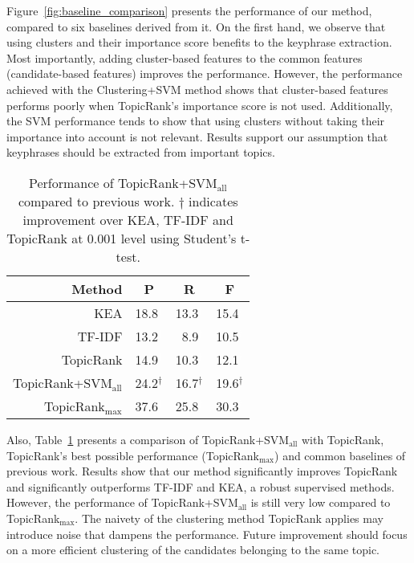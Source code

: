   Figure~\ref{fig:baseline_comparison} presents the performance of our method,
  compared to six baselines derived from it. On the first hand, we observe that
  using clusters and their importance score benefits to the keyphrase
  extraction. Most importantly, adding cluster-based features to the common
  features (candidate-based features) improves the performance. However, the
  performance achieved with the Clustering+SVM method shows that cluster-based
  features performs poorly when Topic\-Rank's importance score is not used.
  Additionally, the SVM performance tends to show that using clusters without
  taking their importance into account is not relevant. Results support our
  assumption that keyphrases should be extracted from important topics.

  \begin{table}
    \centering
    \begin{tabular}{|r|rrr|}
      \hline
      Method & \multicolumn{1}{c}{P} & \multicolumn{1}{c}{R} & \multicolumn{1}{c|}{F}\\
      \hline
      KEA                           & 18.8\textcolor{white}{$^\dagger$} & 13.3\textcolor{white}{$^\dagger$} & 15.4\textcolor{white}{$^\dagger$}\\
      TF-IDF                        & 13.2\textcolor{white}{$^\dagger$} & 8.9\textcolor{white}{$^\dagger$} & 10.5\textcolor{white}{$^\dagger$}\\
      TopicRank                     & 14.9\textcolor{white}{$^\dagger$} & 10.3\textcolor{white}{$^\dagger$} & 12.1\textcolor{white}{$^\dagger$}\\
      TopicRank+SVM$_{\text{all}}$  & 24.2$^\dagger$ & 16.7$^\dagger$ & 19.6$^\dagger$\\
      \hline
      TopicRank$_{\text{max}}$      & 37.6\textcolor{white}{$^\dagger$} & 25.8\textcolor{white}{$^\dagger$} & 30.3\textcolor{white}{$^\dagger$}\\
      \hline
    \end{tabular}
    \caption{Performance of TopicRank+SVM$_{\text{all}}$ compared to previous
             work. $\dagger$ indicates improvement over KEA, TF-IDF and
             TopicRank at 0.001 level using Student's t-test.
             \label{tab:state_of_the_art_comparison}}
  \end{table}

  Also, Table~\ref{tab:state_of_the_art_comparison} presents a comparison of
  TopicRank+SVM$_{\text{all}}$ with TopicRank, TopicRank's best possible
  performance (TopicRank$_{\text{max}}$) and common baselines of previous work.
  Results show that our method significantly improves TopicRank and
  significantly outperforms TF-IDF and KEA, a robust supervised methods.
  However, the performance of TopicRank+SVM$_{\text{all}}$ is still very low
  compared to TopicRank$_{\text{max}}$. The naivety of the clustering method
  TopicRank applies may introduce noise that dampens the performance. Future
  improvement should focus on a more efficient clustering of the candidates
  belonging to the same topic.


